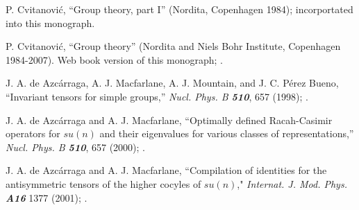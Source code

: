   P. Cvitanovi\'c,
    ``Group theory, part I''
    (Nordita, Copenhagen 1984); incorportated into this monograph.

 P. Cvitanovi\'c,
    ``Group theory''
    (Nordita and Niels Bohr Institute,
    Copenhagen 1984-2007). Web book version of this monograph;
    {\wwwcb{}}.






J. A. de Azc{\'a}rraga, A. J. Macfarlane, A. J. Mountain, and J. C. P\'erez Bueno,
    ``Invariant tensors for simple groups,''
    {\em Nucl.  Phys.  B \bf 510}, 657 (1998);
    .

 J. A. de Azc{\'a}rraga and A. J. Macfarlane,
    ``Optimally defined Racah-Casimir operators for $su(n)$ and their
      eigenvalues for various classes of representations,''
    {\em Nucl.  Phys.  B \bf 510}, 657 (2000);
    .

 J. A. de Azc{\'a}rraga and A. J. Macfarlane,
    ``Compilation of identities for the antisymmetric tensors of
      the higher cocyles of $su(n)$,"
    {\em Internat. J. Mod. Phys. \bf A16} 1377 (2001); %
    .




